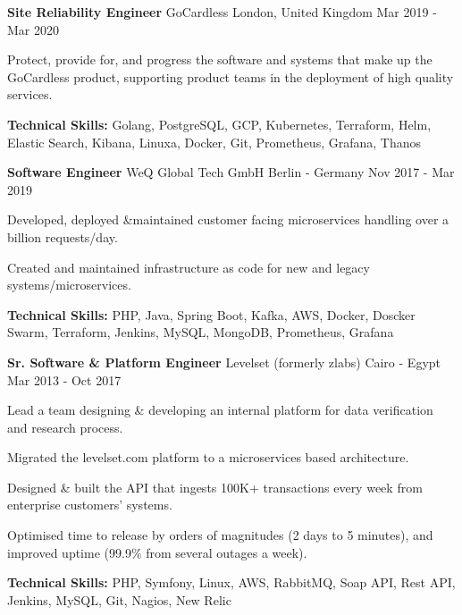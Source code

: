 \begin{cventries}
  \cventry
    {\textbf{Site Reliability Engineer}} %
    {GoCardless} %
    {London, United Kingdom} %
    {Mar 2019 - Mar 2020} %
    {
      \begin{cvitems} %
        \item {Protect, provide for, and progress the software and systems that make up the GoCardless product, supporting product teams in the deployment of high quality services.}
      \item {\textbf{Technical Skills:} Golang, PostgreSQL, GCP, Kubernetes, Terraform, Helm,
        Elastic Search, Kibana, Linuxa, Docker, Git, Prometheus, Grafana, Thanos}
      \end{cvitems}
    }

  \cventry
    {\textbf{Software Engineer}} %
    {WeQ Global Tech GmbH} %
    {Berlin - Germany} %
    {Nov 2017 - Mar 2019} %
    {
      \begin{cvitems} %
        \item {Developed, deployed \&maintained customer facing microservices handling over a billion requests/day.}
        \item {Created and maintained infrastructure as code for new and legacy systems/microservices.}
        \item {\textbf{Technical Skills:} PHP, Java, Spring Boot, Kafka, AWS, Docker, Doscker Swarm,
          Terraform, Jenkins, MySQL, MongoDB, Prometheus, Grafana}
      \end{cvitems}
    }

  \cventry
    {\textbf{Sr. Software \& Platform Engineer}} %
    {Levelset (formerly zlabs)} %
    {Cairo - Egypt} %
    {Mar 2013 - Oct 2017} %
    {
      \begin{cvitems} %
        \item {Lead a team designing \& developing an internal platform for data verification and research process.}
        \item {Migrated the levelset.com platform to a microservices based architecture.}
        \item {Designed \& built the API that ingests 100K+ transactions every week from enterprise customers’ systems.}
        \item {Optimised time to release by orders of magnitudes (2 days to 5 minutes), and improved
          uptime (99.9\% from several outages a week).}
        \item {\textbf{Technical Skills:} PHP, Symfony, Linux, AWS, RabbitMQ, Soap API, Rest API,
          Jenkins, MySQL, Git, Nagios, New Relic}
      \end{cvitems}
    }


\end{cventries}
